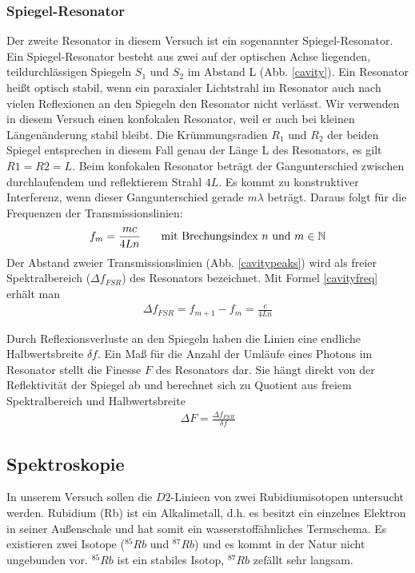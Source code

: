 \documentclass[12pt]{article}
\begin{document}
\subsubsection{Spiegel-Resonator}
Der zweite Resonator in diesem Versuch ist ein sogenannter Spiegel-Resonator. Ein Spiegel-Resonator  besteht aus zwei auf der optischen Achse liegenden,
teildurchlässigen Spiegeln $S_1$ und $S_2$ im Abstand L (Abb. \ref{cavity}). Ein Resonator heißt optisch stabil, wenn ein paraxialer Lichtstrahl im Resonator
auch nach vielen Reflexionen an den Spiegeln den Resonator nicht verlässt. Wir verwenden in diesem Versuch einen konfokalen Resonator, weil er auch bei kleinen Längenänderung stabil bleibt. Die Krümmungsradien $R_1$ und $R_2$ der beiden Spiegel entsprechen in diesem Fall genau der Länge L des Resonators, es gilt $R1 =R2 = L$. Beim konfokalen Resonator beträgt der Gangunterschied zwischen durchlaufendem und reflektierem Strahl $4L$. Es kommt zu konstruktiver Interferenz, wenn dieser Gangunterschied gerade $m\lambda$  beträgt. Daraus folgt für die Frequenzen der Transmissionslinien:
\begin{align}
\label{cavityfreq}
 f_m = \frac{mc}{4Ln}\hspace{15pt}\textnormal{ mit Brechungsindex }n\textnormal{ und } m \in \mathbb N
\end{align}
Der Abstand zweier Transmissionslinien (Abb. \ref{cavitypeaks}) wird als freier Spektralbereich ($\Delta f_{FSR}$) des Resonators bezeichnet. Mit Formel \ref{cavityfreq} erhält man
\begin{align}
\label{freespecrange}
 \Delta f_{FSR} = f_{m+1}-f_{m} = \frac{c}{4Ln}
\end{align}
 
Durch Reflexionsverluste an den Spiegeln haben die Linien eine endliche Halbwertsbreite $\delta f$. Ein Maß für die Anzahl der Umläufe eines Photons im Resonator stellt die Finesse $F$ des Resonators dar. Sie hängt direkt von der Reflektivität der Spiegel ab und berechnet sich zu Quotient aus freiem Spektralbereich und Halbwertsbreite
\begin{align}
\label{finesse}
 \Delta F  = \frac{\Delta f_{FSR}}{\delta f}
\end{align}
\subsection{Spektroskopie}
In unserem Versuch sollen die $D2$-Linieen von zwei Rubidiumisotopen untersucht werden. Rubidium (Rb) ist ein Alkalimetall, d.h. es besitzt ein einzelnes Elektron in seiner Außenschale und hat somit ein wasserstoffähnliches Termschema. Es existieren zwei Isotope ($^{85}Rb$ und $^{87}Rb$) und es kommt in der Natur nicht ungebunden vor. $^{85}Rb$ ist ein stabiles Isotop, $^{87}Rb$ zefällt sehr langsam.
\end{document}
